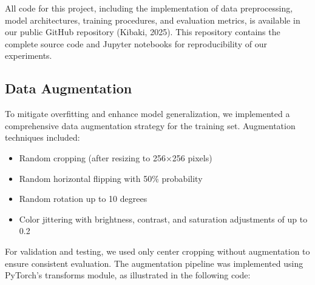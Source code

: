 \documentclass[
]{article}
\providecommand{\tightlist}{%
  \setlength{\itemsep}{0pt}\setlength{\parskip}{0pt}}\usepackage{longtable,booktabs,array}
\begin{document}
All code for this project, including the implementation of data
preprocessing, model architectures, training procedures, and evaluation
metrics, is available in our public GitHub repository (Kibaki, 2025).
This repository contains the complete source code and Jupyter notebooks
for reproducibility of our experiments.

\subsection{Data Augmentation}\label{data-augmentation}

To mitigate overfitting and enhance model generalization, we implemented
a comprehensive data augmentation strategy for the training set.
Augmentation techniques included:

\begin{itemize}
\tightlist
\item
  Random cropping (after resizing to 256×256 pixels)
\item
  Random horizontal flipping with 50\% probability
\item
  Random rotation up to 10 degrees
\item
  Color jittering with brightness, contrast, and saturation adjustments
  of up to 0.2
\end{itemize}

For validation and testing, we used only center cropping without
augmentation to ensure consistent evaluation. The augmentation pipeline
was implemented using PyTorch's transforms module, as illustrated in the
following code:
\end{document}
